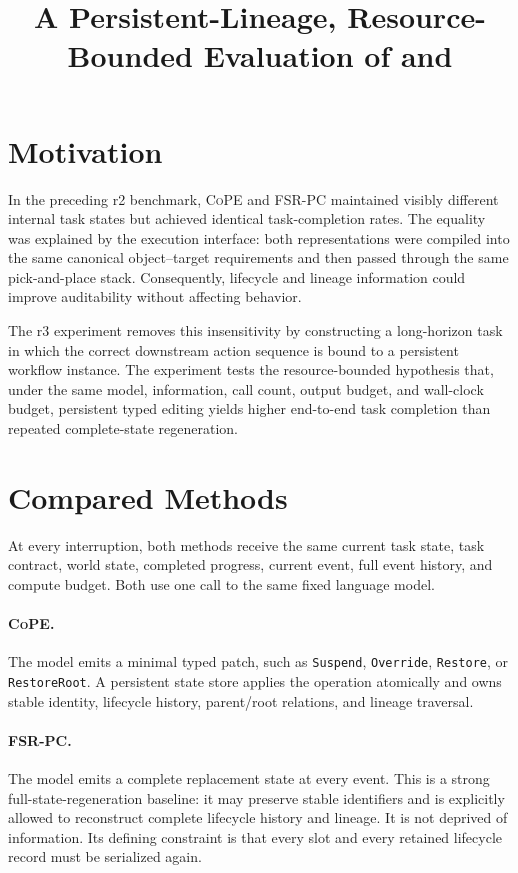 \documentclass[10pt]{article}
\title{A Persistent-Lineage, Resource-Bounded Evaluation of \CoPE{} and
\FSRPC{}}
\author{}
\date{}
\newcommand{\CoPE}{\textsc{CoPE}}
\newcommand{\FSRPC}{\textsc{FSR-PC}}
\begin{document}
\maketitle

\section{Motivation}

In the preceding r2 benchmark, \CoPE{} and \FSRPC{} maintained visibly
different internal task states but achieved identical task-completion rates.
The equality was explained by the execution interface: both representations
were compiled into the same canonical object--target requirements and then
passed through the same pick-and-place stack.  Consequently, lifecycle and
lineage information could improve auditability without affecting behavior.

The r3 experiment removes this insensitivity by constructing a long-horizon
task in which the correct downstream action sequence is bound to a persistent
workflow instance.  The experiment tests the resource-bounded hypothesis that,
under the same model, information, call count, output budget, and wall-clock
budget, persistent typed editing yields higher end-to-end task completion than
repeated complete-state regeneration.

\section{Compared Methods}

At every interruption, both methods receive the same current task state, task
contract, world state, completed progress, current event, full event history,
and compute budget.  Both use one call to the same fixed language model.

\paragraph{\CoPE{}.}
The model emits a minimal typed patch, such as \texttt{Suspend},
\texttt{Override}, \texttt{Restore}, or \texttt{RestoreRoot}.  A persistent
state store applies the operation atomically and owns stable identity,
lifecycle history, parent/root relations, and lineage traversal.

\paragraph{\FSRPC{}.}
The model emits a complete replacement state at every event.  This is a strong
full-state-regeneration baseline: it may preserve stable identifiers and is
explicitly allowed to reconstruct complete lifecycle history and lineage.  It
is not deprived of information.  Its defining constraint is that every slot
and every retained lifecycle record must be serialized again.
\end{document}

